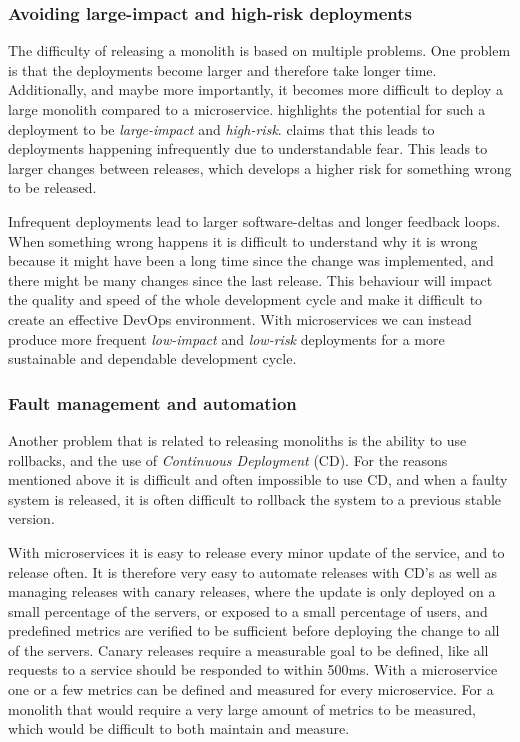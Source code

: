 \documentclass[a4paper]{article}
\begin{document}
\subsubsection{Avoiding large-impact and high-risk deployments}
The difficulty of releasing a monolith is based on multiple problems. One problem is that the deployments become larger and therefore take longer time. Additionally, and maybe more importantly, it becomes more difficult to deploy a large monolith compared to a microservice. \citeauthor{Newman2015} highlights the potential for such a deployment to be \textit{large-impact} and \textit{high-risk}. \citeauthor{Newman2015} claims that this leads to deployments happening infrequently due to understandable fear. This leads to larger changes between releases, which develops a higher risk for something wrong to be released. \cite[p.~6]{Newman2015}

Infrequent deployments lead to larger software-deltas and longer feedback loops. When something wrong happens it is difficult to understand why it is wrong because it might have been a long time since the change was implemented, and there might be many changes since the last release. This behaviour will impact the quality and speed of the whole development cycle and make it difficult to create an effective DevOps environment. With microservices we can instead produce more frequent \textit{low-impact} and \textit{low-risk} deployments for a more sustainable and dependable development cycle.

\subsubsection{Fault management and automation}
Another problem that is related to releasing monoliths is the ability to use rollbacks, and the use of \textit{Continuous Deployment} (CD). For the reasons mentioned above it is difficult and often impossible to use CD, and when a faulty system is released, it is often difficult to rollback the system to a previous stable version.

With microservices it is easy to release every minor update of the service, and to release often. It is therefore very easy to automate releases with CD's as well as managing releases with canary releases, where the update is only deployed on a small percentage of the servers, or exposed to a small percentage of users, and predefined metrics are verified to be sufficient before deploying the change to all of the servers. Canary releases require a measurable goal to be defined, like all requests to a service should be responded to within 500ms. With a microservice one or a few metrics can be defined and measured for every microservice. For a monolith that would require a very large amount of metrics to be measured, which would be difficult to both maintain and measure.
\end{document}
